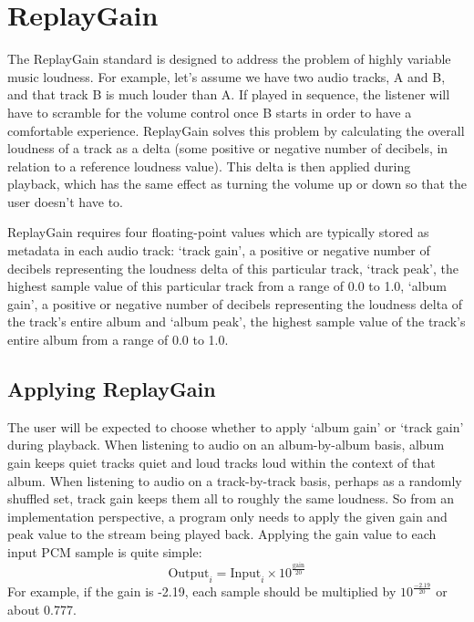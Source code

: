
\chapter{ReplayGain}
The ReplayGain standard is designed to address the problem of
highly variable music loudness.
For example, let's assume we have two audio tracks, A and B, and that
track B is much louder than A.
If played in sequence, the listener will have to scramble for the volume
control once B starts in order to have a comfortable experience.
ReplayGain solves this problem by calculating the overall loudness of a
track as a delta (some positive or negative number of decibels, in
relation to a reference loudness value).
This delta is then applied during playback, which has the same effect
as turning the volume up or down so that the user doesn't have to.

ReplayGain requires four floating-point values which are typically
stored as metadata in each audio track:
`track gain', a positive or negative number of decibels representing
the loudness delta of this particular track,
`track peak', the highest sample value of this particular track
from a range of 0.0 to 1.0,
`album gain', a positive or negative number of decibels representing
the loudness delta of the track's entire album
and `album peak', the highest sample value of the track's entire album
from a range of 0.0 to 1.0.

\section{Applying ReplayGain}
The user will be expected to choose whether to apply `album gain'
or `track gain' during playback.
When listening to audio on an album-by-album basis, album gain
keeps quiet tracks quiet and loud tracks loud within the context of
that album.
When listening to audio on a track-by-track basis, perhaps as
a randomly shuffled set, track gain keeps them all to roughly the same
loudness.
So from an implementation perspective, a program only needs to apply
the given gain and peak value to the stream being played back.
Applying the gain value to each input PCM sample is quite simple:
\begin{equation}
\text{Output}_i = \text{Input}_i \times 10 ^ \frac{\text{gain}}{20}
\end{equation}
For example, if the gain is -2.19, each sample should be multiplied by
$10 ^ \frac{-2.19}{20}$ or about 0.777.


